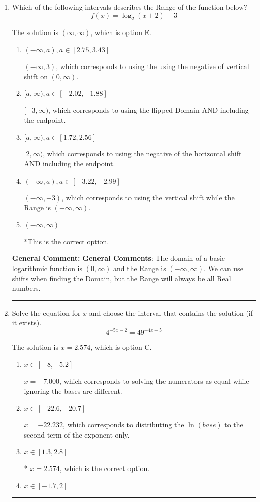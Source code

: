 \documentclass{extbook}[14pt]
\newcommand{\litem}[1]{\item #1

\rule{\textwidth}{0.4pt}}
\begin{document}
\begin{enumerate}\litem{
Which of the following intervals describes the Range of the function below?
\[ f(x) = \log_2{(x+2)}-3 \]

The solution is \( (\infty, \infty) \), which is option E.\begin{enumerate}[label=\Alph*.]
\item \( (-\infty, a), a \in [2.75, 3.43] \)

$(-\infty, 3)$, which corresponds to using the using the negative of vertical shift on $(0, \infty)$.
\item \( [a, \infty), a \in [-2.02, -1.88] \)

$[-3, \infty)$, which corresponds to using the flipped Domain AND including the endpoint.
\item \( [a, \infty), a \in [1.72, 2.56] \)

$[2, \infty)$, which corresponds to using the negative of the horizontal shift AND including the endpoint.
\item \( (-\infty, a), a \in [-3.22, -2.99] \)

$(-\infty, -3)$, which corresponds to using the vertical shift while the Range is $(-\infty, \infty)$.
\item \( (-\infty, \infty) \)

*This is the correct option.
\end{enumerate}

\textbf{General Comment:} \textbf{General Comments}: The domain of a basic logarithmic function is $(0, \infty)$ and the Range is $(-\infty, \infty)$. We can use shifts when finding the Domain, but the Range will always be all Real numbers.
}
\litem{
Solve the equation for $x$ and choose the interval that contains the solution (if it exists).
\[ 4^{-5x-2} = 49^{-4x+5} \]

The solution is \( x = 2.574 \), which is option C.\begin{enumerate}[label=\Alph*.]
\item \( x \in [-8, -5.2] \)

$x = -7.000$, which corresponds to solving the numerators as equal while ignoring the bases are different.
\item \( x \in [-22.6, -20.7] \)

$x = -22.232$, which corresponds to distributing the $\ln(base)$ to the second term of the exponent only.
\item \( x \in [1.3, 2.8] \)

* $x = 2.574$, which is the correct option.
\item \( x \in [-1.7, 2] \)


\end{enumerate}}
\end{enumerate}
\end{document}
